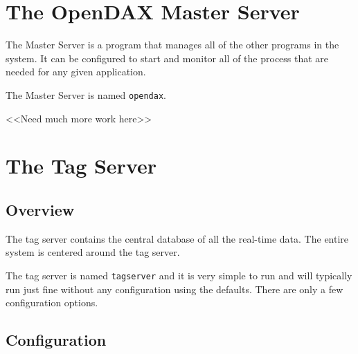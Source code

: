 	\chapter{The OpenDAX Master Server}

    The \opendax Master Server is a program that manages all of the
    other programs in the \opendax system.  It can be configured to
    start and monitor all of the process that are needed for any
    given application.

    The Master Server is named \texttt{opendax}.

    <<Need much more work here>>

	\chapter{The Tag Server}

    \section{Overview}
	The tag server contains the central database of all the real-time data.  The
	entire system is centered around the tag server.

	The tag server is named \texttt{tagserver} and it is very simple to run
	and will
	typically run just fine without any configuration using the defaults.  There are
	only a few configuration options.

    \section{Configuration}

